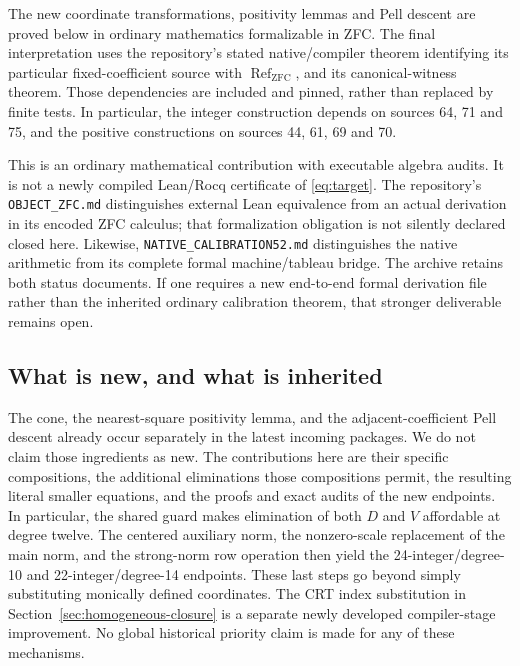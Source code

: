 \documentclass[11pt]{article}
\theoremstyle{remark}\newtheorem{remark}[theorem]{Remark}
\newcommand{\ZFC}{\mathrm{ZFC}}
\begin{document}
The new coordinate transformations, positivity lemmas and Pell descent
are proved below in ordinary mathematics formalizable in ZFC. The final
interpretation uses the repository's stated native/compiler theorem
identifying its particular fixed-coefficient source with
$\operatorname{Ref}_{\ZFC}$, and its canonical-witness theorem.
Those dependencies are included and pinned, rather than replaced by finite
tests. In particular, the integer construction depends on sources 64, 71
and 75, and the positive constructions on sources 44, 61, 69 and 70.

This is an ordinary mathematical contribution with executable algebra
audits. It is not a newly compiled Lean/Rocq certificate of
\eqref{eq:target}. The repository's \texttt{OBJECT\_ZFC.md} distinguishes
external Lean equivalence from an actual derivation in its encoded ZFC
calculus; that formalization obligation is not silently declared closed
here. Likewise, \texttt{NATIVE\_CALIBRATION52.md} distinguishes the native
arithmetic from its complete formal machine/tableau bridge. The archive
retains both status documents. If one requires a new end-to-end formal
derivation file rather than the inherited ordinary calibration theorem,
that stronger deliverable remains open.

\subsection{What is new, and what is inherited}

The cone, the nearest-square positivity lemma, and the adjacent-coefficient
Pell descent already occur separately in the latest incoming packages.
We do not claim those ingredients as new. The contributions here are their
specific compositions, the additional eliminations those compositions
permit, the resulting literal smaller equations, and the proofs and exact
audits of the new endpoints. In particular, the shared guard makes
elimination of both $D$ and $V$ affordable at degree twelve. The centered
auxiliary norm, the nonzero-scale replacement of the main norm, and the
strong-norm row operation then yield the 24-integer/degree-10 and
22-integer/degree-14 endpoints. These last steps go beyond simply
substituting monically defined coordinates.
The CRT index substitution in Section~\ref{sec:homogeneous-closure} is a
separate newly developed compiler-stage improvement. No global historical
priority claim is made for any of these mechanisms.





\end{document}
